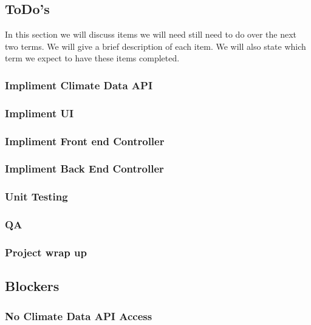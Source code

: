 \documentclass[onecolumn, draftclsnofoot,10pt, compsoc]{article}
\begin{document}
	\subsection{ToDo's}
	    In this section we will discuss items we will need still need to do over the next two terms. We will give a brief description of each item. We will also state which term we expect to have these items completed.\\
	    
	    \subsubsection{Impliment Climate Data API}
	    
	    \subsubsection{Impliment UI}
	    
	    \subsubsection{Impliment Front end Controller}
	    
	    \subsubsection{Impliment Back End Controller}
	    
	    \subsubsection{Unit Testing}
	    
	    \subsubsection{QA}
	    
	    \subsubsection{Project wrap up}
	
	\subsection{Blockers}
	    \subsubsection{No Climate Data API Access}
	    
\end{document}
